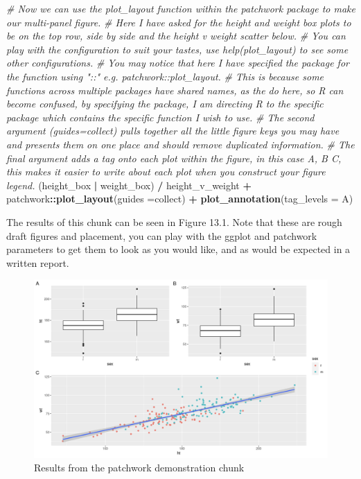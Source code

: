 \documentclass[
]{book}
\newenvironment{Shaded}{\begin{snugshade}}{\end{snugshade}}
\newcommand{\AttributeTok}[1]{\textcolor[rgb]{0.13,0.29,0.53}{#1}}
\newcommand{\CommentTok}[1]{\textcolor[rgb]{0.56,0.35,0.01}{\textit{#1}}}
\newcommand{\FunctionTok}[1]{\textcolor[rgb]{0.13,0.29,0.53}{\textbf{#1}}}
\newcommand{\NormalTok}[1]{#1}
\newcommand{\SpecialCharTok}[1]{\textcolor[rgb]{0.81,0.36,0.00}{\textbf{#1}}}
\newcommand{\StringTok}[1]{\textcolor[rgb]{0.31,0.60,0.02}{#1}}
\begin{document}
\begin{Shaded}
\begin{Highlighting}[]
\CommentTok{\# Now we can use the plot\_layout function within the patchwork package to make our multi{-}panel figure.}
\CommentTok{\# Here I have asked for the height and weight box plots to be on the top row, side by side and the height v weight scatter below.}
\CommentTok{\# You can play with the configuration to suit your tastes, use help(plot\_layout) to see some other configurations.}
\CommentTok{\# You may notice that here I have specified the package for the function using "::" e.g. patchwork::plot\_layout.}
\CommentTok{\# This is because some functions across multiple packages have shared names, as the do here, so R can become confused, by specifying the package, I am directing R to the specific package which contains the specific function I wish to use. }
\CommentTok{\# The second argument (guides=\textquotesingle{}collect\textquotesingle{}) pulls together all the little figure keys you may have and presents them on one place and should remove duplicated information.}
\CommentTok{\# The final argument adds a tag onto each plot within the figure, in this case A, B C, this makes it easier to write about each plot when you construct your figure legend.}
\NormalTok{(height\_box }\SpecialCharTok{|}\NormalTok{ weight\_box) }\SpecialCharTok{/}\NormalTok{ height\_v\_weight }\SpecialCharTok{+} 
\NormalTok{  patchwork}\SpecialCharTok{::}\FunctionTok{plot\_layout}\NormalTok{(}\AttributeTok{guides =}\StringTok{\textquotesingle{}collect\textquotesingle{}}\NormalTok{) }\SpecialCharTok{+}
  \FunctionTok{plot\_annotation}\NormalTok{(}\AttributeTok{tag\_levels =} \StringTok{\textquotesingle{}A\textquotesingle{}}\NormalTok{)}
\end{Highlighting}
\end{Shaded}

The results of this chunk can be seen in Figure 13.1. Note that these are rough draft figures and placement, you can play with the ggplot and patchwork parameters to get them to look as you would like, and as would be expected in a written report.

\begin{figure}
\includegraphics[width=0.9\linewidth]{figures/multipanel} \caption{Results from the patchwork demonstration chunk}\label{fig:unnamed-chunk-78}
\end{figure}
\end{document}
